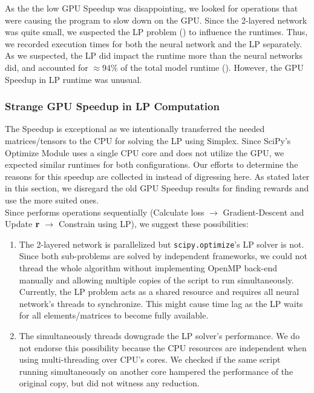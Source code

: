 As the the low GPU Speedup was disappointing, we looked for operations that were causing the program to slow down on the GPU. Since the 2-layered network was quite small, we suspected the LP problem () to influence the runtimes. Thus, we recorded execution times for both the neural network and the LP separately. As we suspected, the LP did impact the runtime more than the neural networks did, and accounted for $\approx 94\%$ of the total model runtime (). However, the GPU Speedup in LP runtime was unusual.

\subsubsection{Strange GPU Speedup in LP Computation}
The Speedup is exceptional as we intentionally transferred the needed matrices/tensors to the CPU for solving the LP using Simplex. Since SciPy's Optimize Module uses a single CPU core and does not utilize the GPU, we expected similar runtimes for both configurations. Our efforts to determine the reasons for this speedup are collected in  instead of digressing here. As stated later in this section, we disregard the old GPU Speedup results for finding rewards and use the more suited ones.\\

Since  performs operations sequentially (Calculate loss $\rightarrow$ Gradient-Descent and Update $\mathbf{r}$ $\rightarrow$ Constrain using LP), we suggest these possibilities:
\begin{enumerate}
    \item The 2-layered network is parallelized but \texttt{scipy.optimize}'s LP solver is not. Since both sub-problems are solved by independent frameworks, we could not thread the whole algorithm without implementing OpenMP \cite{OpenMP} back-end manually and allowing multiple copies of the script to run simultaneously. Currently, the LP problem acts as a shared resource and requires all neural network's threads to synchronize. This might cause time lag as the LP waits for all elements/matrices to become fully available.
    \item The simultaneously threads downgrade the LP solver's performance. We do not endorse this possibility because the CPU resources are independent when using multi-threading over CPU's cores. We checked if the same script running simultaneously on another core hampered the performance of the original copy, but did not witness any reduction.
\end{enumerate}

